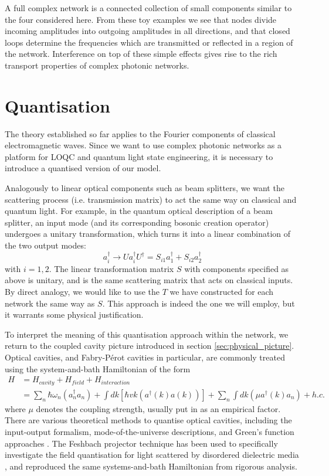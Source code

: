 A full complex network is a connected collection of small components similar to the four considered here. From these toy examples we see that nodes divide incoming amplitudes into outgoing amplitudes in all directions, and that closed loops determine the frequencies which are transmitted or reflected in a region of the network. Interference on top of these simple effects gives rise to the rich transport properties of complex photonic networks.  


\section{Quantisation}
\label{sec:quantisation}
The theory established so far applies to the Fourier components of classical electromagnetic waves. Since we want to use complex photonic networks as a platform for LOQC and quantum light state engineering, it is necessary to introduce a quantised version of our model.

Analogously to linear optical components such as beam splitters, we want the scattering process (i.e. transmission matrix) to act the same way on classical and quantum light. For example, in the quantum optical description of a beam splitter, an input mode (and its corresponding bosonic creation operator) undergoes a unitary transformation, which turns it into a linear combination of the two output modes:
\begin{equation}
    \label{eq:beamsplitter}
    a_i^\dagger \rightarrow Ua_i^\dagger U^\dagger = S_{i1}a_1^\dagger + S_{i2}a_2^\dagger
\end{equation}
with $i=1,2$. The linear transformation matrix $S$ with components specified as above is unitary, and is the same scattering matrix that acts on classical inputs. By direct analogy, we would like to use the $T$ we have constructed for each network the same way as $S$. This approach is indeed the one we will employ, but it warrants some physical justification.

To interpret the meaning of this quantisation approach within the network, we return to the coupled cavity picture introduced in section \ref{sec:physical_picture}. Optical cavities, and Fabry-P\'erot cavities in particular, are commonly treated using the system-and-bath Hamiltonian of the form \cite{Zandi2012}
\begin{align}
\label{eq:H_fabryperot}
        H &= H_{cavity} + H_{field} + H_{interaction}\\ \nonumber
          &= \sum_n \hbar\omega_n(a_n^\dagger a_n) + \int dk [\hbar vk  (a^\dagger(k)a(k))] + \sum_n\int dk (\mu a^\dagger(k)a_n) + h.c.
\end{align}
where $\mu$ denotes the coupling strength, usually put in as an empirical factor. There are various theoretical methods to quantise optical cavities, including the input-output formalism, mode-of-the-universe descriptions, and Green's function approaches \cite{Barlow2015}. The Feshbach projector technique has been used to specifically investigate the field quantisation for light scattered by disordered dielectric media \cite{Viviescas2003}, and reproduced the same systems-and-bath Hamiltonian from rigorous analysis. 

